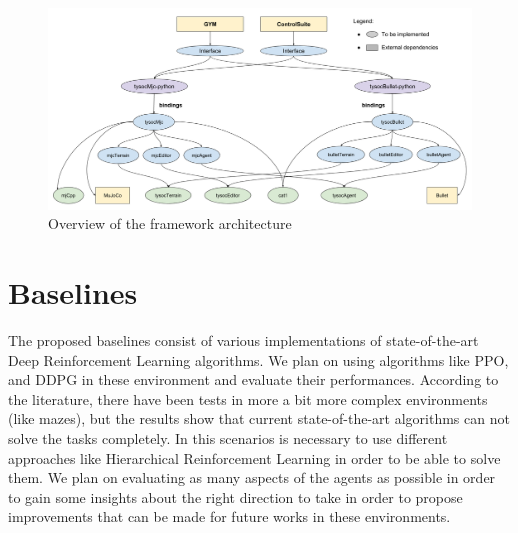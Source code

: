 \begin{figure}
    \centering
    \includegraphics[width=8in]{./chapters/imgs/img_proposal_part1_framework.png}
    \caption[img_proposal_part1_framework]{Overview of the framework architecture}
    \label{fig:img_proposal_part1_framework}
\end{figure}

\section{Baselines}

The proposed baselines consist of various implementations of state-of-the-art Deep Reinforcement Learning
algorithms. We plan on using algorithms like PPO, and DDPG in these environment and evaluate their performances.
According to the literature, there have been tests in more a bit more complex environments (like mazes), but
the results show that current state-of-the-art algorithms can not solve the tasks completely. In this scenarios
is necessary to use different approaches like Hierarchical Reinforcement Learning in order to be able to solve them.
We plan on evaluating as many aspects of the agents as possible in order to gain some insights about the right
direction to take in order to propose improvements that can be made for future works in these environments.

\figProposalComparison